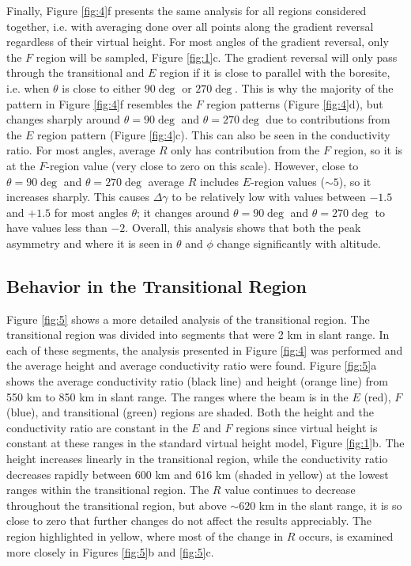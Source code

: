Finally, Figure \ref{fig:4}f presents the same analysis for all regions considered together, i.e. with averaging done over all points along the gradient reversal regardless of their virtual height. For most angles of the gradient reversal, only the \(F\) region will be sampled, Figure \ref{fig:1}c. The gradient reversal will only pass through the transitional and \(E\) region if it is close to parallel with the boresite, i.e. when \(\theta\) is close to either \(90\deg\) or \(270\deg\).  This is why the majority of the pattern in Figure \ref{fig:4}f resembles the \(F\) region patterns (Figure \ref{fig:4}d), but changes sharply around \(\theta=90\deg\) and \(\theta=270\deg\) due to contributions from the \(E\) region pattern (Figure \ref{fig:4}c).  This can also be seen in the conductivity ratio. For most angles, average \(R\) only has contribution from the \(F\) region, so it is at the \(F\)-region value (very close to zero on this scale).  However, close to \(\theta=90\deg\) and \(\theta=270\deg\) average \(R\) includes \(E\)-region values (\(\sim5\)), so it increases sharply.  This causes \(\Delta\gamma\) to be relatively low with values between \(-1.5\) and \(+1.5\) for most angles \(\theta\); it changes around \(\theta=90\deg\) and \(\theta=270\deg\) to have values less than \(-2\).  Overall, this analysis shows that both the peak asymmetry and where it is seen in \(\theta\) and \(\phi\) change significantly with altitude.




\subsection{Behavior in the Transitional Region}
Figure \ref{fig:5} shows a more detailed analysis of the transitional region.  The transitional region was divided into segments that were 2 km in slant range. In each of these segments, the analysis presented in Figure \ref{fig:4} was performed and the average height and average conductivity ratio were found.  Figure \ref{fig:5}a shows the average conductivity ratio (black line) and height (orange line) from 550 km to 850 km in slant range.  The ranges where the beam is in the \(E\) (red), \(F\) (blue), and transitional (green) regions are shaded. Both the height and the conductivity ratio are constant in the \(E\) and \(F\) regions since virtual height is constant at these ranges in the standard virtual height model, Figure \ref{fig:1}b. The height increases linearly in the transitional region, while the conductivity ratio decreases rapidly between 600 km and 616 km (shaded in yellow) at the lowest ranges within the transitional region. The \(R\) value continues to decrease throughout the transitional region, but above \(\sim620\) km in the slant range, it is so close to zero that further changes do not affect the results appreciably.  The region highlighted in yellow, where most of the change in \(R\) occurs, is examined more closely in Figures \ref{fig:5}b and \ref{fig:5}c.

